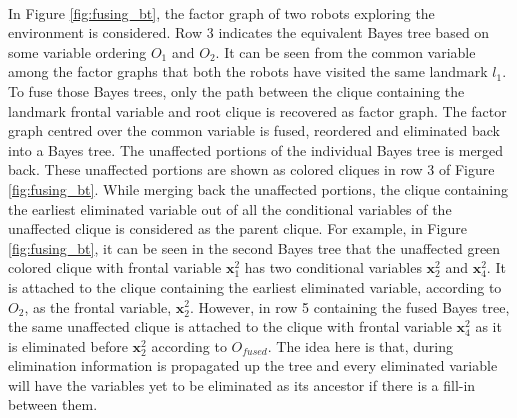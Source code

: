 \paragraph{}
In Figure \ref{fig:fusing_bt}, the factor graph of two robots exploring the environment is considered. Row 3 indicates the equivalent Bayes tree based on some variable ordering $O_1$ and $O_2$. It can be seen from the common variable among the factor graphs that both the robots have visited the same landmark $l_1$. To fuse those Bayes trees, only the path between the clique containing the landmark frontal variable and root clique is recovered as factor graph. The factor graph centred over the common variable is fused, reordered and eliminated back into a Bayes tree. The unaffected portions of the individual Bayes tree is merged back. These unaffected portions are shown as colored cliques in row 3 of Figure \ref{fig:fusing_bt}. While merging back the unaffected portions, the clique containing the earliest eliminated variable out of all the conditional variables of the unaffected clique is considered as the parent clique. For example, in Figure \ref{fig:fusing_bt}, it can be seen in the second Bayes tree that the unaffected green colored clique with frontal variable $\textbf{x}_1^2$ has two conditional variables $\textbf{x}_2^2$ and $\textbf{x}_4^2$. It is attached to the clique containing the earliest eliminated variable, according to $O_2$, as the frontal variable, $\textbf{x}_2^2$. However, in row 5 containing the fused Bayes tree, the same unaffected clique is attached to the clique with frontal variable $\textbf{x}_4^2$ as it is eliminated before $\textbf{x}_2^2$ according to $O_{fused}$. The idea here is that, during elimination information is propagated up the tree and every eliminated variable will have the variables yet to be eliminated as its ancestor if there is a fill-in between them.


